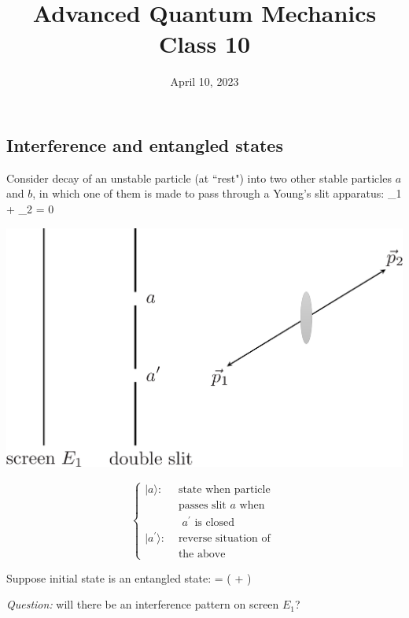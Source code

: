 \documentclass[12pt]{article}
\title{Advanced Quantum Mechanics\\Class 10}
\date{April 10, 2023}                                           %
\begin{document}
\maketitle

\subsection{Interference and entangled states}

Consider decay of an unstable particle (at
``rest") into two other stable particles $a$ and $b$, in which
one of them is made to pass through a Young's
slit apparatus:
\be
{}_1 + _2 = 0
\ee

\begin{minipage}{0.5\textwidth}
\includegraphics[width=\textwidth]{Figures/DoubleSlitEntangled.pdf}
\end{minipage}%
\begin{minipage}{0.5\textwidth}
\[
\left\{
\begin{aligned}
|a\rangle: & \text { state when particle } \\ 
& \text { passes slit $a$ when } \\ 
& \text { $a^{\prime}$ is closed } \\
|a^{\prime}\rangle:
& \text { reverse situation of } \\
& \text { the above } 
\end{aligned}
\right.
\]
\end{minipage}

Suppose initial state is an entangled state:
\be
\ket{\psi} = 
\left(
\otimes{} + \otimes{}
\right)
\ee

\emph{Question:} will there be an interference pattern
on screen \(E_{1}\)?
\end{document}
